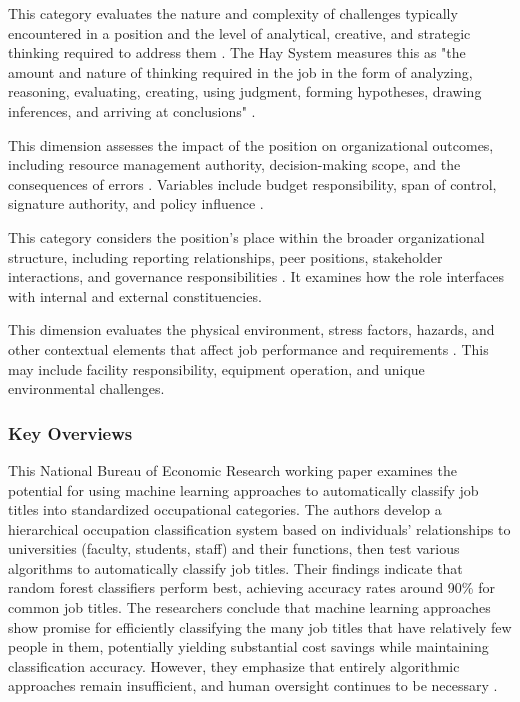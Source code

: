 \documentclass[../main.tex]{subfiles}
\begin{document}
This category evaluates the nature and complexity of challenges typically encountered in a position and the level of analytical, creative, and strategic thinking required to address them \cite{peoplebox2024, synergogy2024}. The Hay System measures this as "the amount and nature of thinking required in the job in the form of analyzing, reasoning, evaluating, creating, using judgment, forming hypotheses, drawing inferences, and arriving at conclusions" \cite{waterloo2024}.

This dimension assesses the impact of the position on organizational outcomes, including resource management authority, decision-making scope, and the consequences of errors \cite{deel2024, peoplebox2024}. Variables include budget responsibility, span of control, signature authority, and policy influence \cite{wm2024}.

This category considers the position's place within the broader organizational structure, including reporting relationships, peer positions, stakeholder interactions, and governance responsibilities \cite{wm2024}. It examines how the role interfaces with internal and external constituencies.

This dimension evaluates the physical environment, stress factors, hazards, and other contextual elements that affect job performance and requirements \cite{synergogy2024}. This may include facility responsibility, equipment operation, and unique environmental challenges.

\subsubsection{Key Overviews}

This National Bureau of Economic Research working paper examines the potential for using machine learning approaches to automatically classify job titles into standardized occupational categories. The authors develop a hierarchical occupation classification system based on individuals' relationships to universities (faculty, students, staff) and their functions, then test various algorithms to automatically classify job titles. Their findings indicate that random forest classifiers perform best, achieving accuracy rates around 90\% for common job titles. The researchers conclude that machine learning approaches show promise for efficiently classifying the many job titles that have relatively few people in them, potentially yielding substantial cost savings while maintaining classification accuracy. However, they emphasize that entirely algorithmic approaches remain insufficient, and human oversight continues to be necessary \cite{ikudo2018}.
\end{document}
